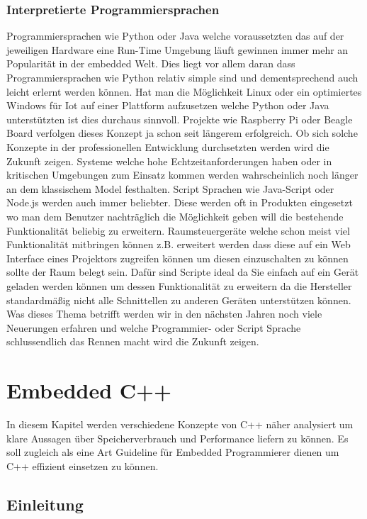 \documentclass[MES,Master,ngerman]{twbook}%
\begin{document}
\subsection{Interpretierte Programmiersprachen}
Programmiersprachen wie Python oder Java welche voraussetzten das auf der jeweiligen Hardware eine Run-Time Umgebung läuft gewinnen immer mehr an Popularität in der embedded Welt. Dies liegt vor allem daran dass Programmiersprachen wie Python relativ simple sind und dementsprechend auch leicht erlernt werden können. Hat man die Möglichkeit Linux oder ein optimiertes Windows für Iot auf einer Plattform aufzusetzen welche Python oder Java unterstützten ist dies durchaus sinnvoll. Projekte wie Raspberry Pi oder Beagle Board verfolgen dieses Konzept ja schon seit längerem erfolgreich. Ob sich solche Konzepte in der professionellen Entwicklung durchsetzten werden wird die Zukunft zeigen. Systeme welche hohe Echtzeitanforderungen haben oder in kritischen Umgebungen zum Einsatz kommen werden wahrscheinlich noch länger an dem klassischem Model festhalten. Script Sprachen wie Java-Script oder Node.js werden auch immer beliebter. Diese werden oft in Produkten eingesetzt wo man dem Benutzer nachträglich die Möglichkeit geben will die bestehende Funktionalität beliebig zu erweitern. Raumsteuergeräte welche schon meist viel Funktionalität mitbringen können z.B. erweitert werden dass diese auf ein Web Interface eines Projektors zugreifen können um diesen einzuschalten zu können sollte der Raum belegt sein. Dafür sind Scripte ideal da Sie einfach auf ein Gerät geladen werden können um dessen Funktionalität zu erweitern da die Hersteller standardmäßig nicht alle Schnittellen zu anderen Geräten unterstützen können. Was dieses Thema betrifft werden wir in den nächsten Jahren noch viele Neuerungen erfahren und welche Programmier- oder Script Sprache schlussendlich das Rennen macht wird die Zukunft zeigen.

\newpage


\chapter{Embedded C++}
In diesem Kapitel werden verschiedene Konzepte von C++ näher analysiert um klare Aussagen über Speicherverbrauch und Performance liefern zu können. Es soll zugleich als eine Art Guideline für Embedded Programmierer dienen um C++ effizient einsetzen zu können. \newline 
\section{Einleitung}
\end{document}
